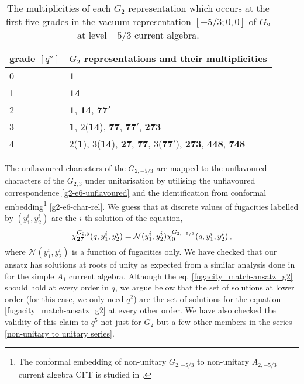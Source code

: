 \documentclass[a4paper,12pt]{article}
\begin{document}
\begin{table}
\centering
\begin{tabular}{ |p{2cm}|p{8cm}|  }
\hline
grade $[q^n]$ & $G_ 2$ representations and their multiplicities \\
\hline
0 & {\bf 1} \\
\hline
1 & {\bf 14} \\
\hline
2 & {\bf 1}, {\bf 14}, {\bf 77$'$}\\
\hline
3 & {\bf 1}, 2({\bf 14}), {\bf 77}, {\bf 77$'$}, {\bf 273}\\
\hline
4 & 2({\bf 1}), 3({\bf 14}), {\bf 27}, {\bf 77}, 3({\bf 77$'$}), {\bf 273}, {\bf 448}, {\bf 748}\\
\hline
\end{tabular}
\caption{The multiplicities of each $G_2$ representation which occurs at the first five grades in the vacuum representation $[-5/3;0,0]$ of $G_{2}$ at level $-5/3$ current algebra.}
\end{table}

The unflavoured characters of the $G_{2,-5/3}$ are mapped to the unflavoured characters of the $G_{2,3}$ under unitarisation by utilising the unflavoured correspondence \eqref{g2-e6-unflavoured} and the identification from conformal embedding\footnote{The conformal embedding of non-unitary $G_{2,-5/3}$ to non-unitary $A_{2,-5/3}$ current algebra CFT is studied in \cite{adamovic2011general}. } \eqref{g2-e6-char-rel}. We guess that at discrete values of fugacities labelled by $(y_1^i,y_2^i)$ are the $i$-th solution of the equation,
 \begin{equation}\label{fugacity_match-ansatz_g2}
        \chi^{G_{2,3}}_{\bf 27}(q,y_1^i,y_2^i)=\mathcal{N}(y_1^i,y_2^i)\chi^{G_{2,-5/3}}_{0}(q,y_1^i,y_2^i)\, ,
    \end{equation}
where $\mathcal{N}(y_1^i,y_2^i)$ is a function of fugacities only. We have checked that our ansatz has solutions at roots of unity as expected from a similar analysis done in \cite{Buican:2019huq} for the simple $A_1$ current algebra. Although the eq. \eqref{fugacity_match-ansatz_g2} should hold at every order in $q$, we argue below that the set of solutions at lower order (for this case, we only need $q^2$) are the set of solutions for the equation \ref{fugacity_match-ansatz_g2} at every other order. We have also checked the validity of this claim to $q^5$ not just for $G_2$ but a few other members in the series \eqref{non-unitary to unitary series}. 
\end{document}
